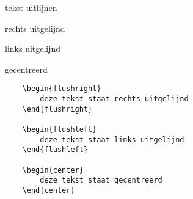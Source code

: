 \begin{frame}[fragile]{tekst uitlijnen}
    
    \begin{flushright}
            rechts uitgelijnd
    \end{flushright}

    \begin{flushleft}
        links uitgelijnd
    \end{flushleft}

    \begin{center}
        gecentreerd
    \end{center}

    \begin{verbatim}
    \begin{flushright}
        deze tekst staat rechts uitgelijnd
    \end{flushright}

    \begin{flushleft}
        deze tekst staat links uitgelijnd
    \end{flushleft}

    \begin{center}
        deze tekst staat gecentreerd
    \end{center}
    \end{verbatim}

\end{frame}